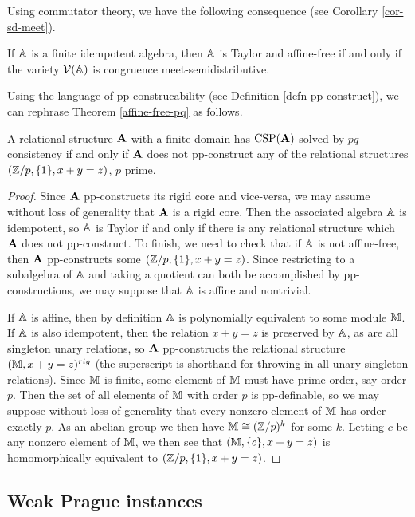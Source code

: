\documentclass[letterpaper,11pt]{article}
\DeclareMathOperator{\CSP}{CSP}
\begin{document}
Using commutator theory, we have the following consequence (see Corollary \ref{cor-sd-meet}).

\begin{cor} If $\mathbb{A}$ is a finite idempotent algebra, then $\mathbb{A}$ is Taylor and affine-free if and only if the variety $\mathcal{V}(\mathbb{A})$ is congruence meet-semidistributive.
\end{cor}

Using the language of pp-construcability (see Definition \ref{defn-pp-construct}), we can rephrase Theorem \ref{affine-free-pq} as follows.

\begin{cor} A relational structure $\mathbf{A}$ with a finite domain has $\CSP(\fA)$ solved by $pq$-consistency if and only if $\mathbf{A}$ does not pp-construct any of the relational structures $(\mathbb{Z}/p,\{1\},x+y=z)$, $p$ prime.
\end{cor}
\begin{proof} Since $\mathbf{A}$ pp-constructs its rigid core and vice-versa, we may assume without loss of generality that $\mathbf{A}$ is a rigid core. Then the associated algebra $\mathbb{A}$ is idempotent, so $\mathbb{A}$ is Taylor if and only if there is any relational structure which $\mathbf{A}$ does not pp-construct. To finish, we need to check that if $\mathbb{A}$ is not affine-free, then $\mathbf{A}$ pp-constructs some $(\mathbb{Z}/p,\{1\},x+y=z)$. Since restricting to a subalgebra of $\mathbb{A}$ and taking a quotient can both be accomplished by pp-constructions, we may suppose that $\mathbb{A}$ is affine and nontrivial.

If $\mathbb{A}$ is affine, then by definition $\mathbb{A}$ is polynomially equivalent to some module $\mathbb{M}$. If $\mathbb{A}$ is also idempotent, then the relation $x+y=z$ is preserved by $\mathbb{A}$, as are all singleton unary relations, so $\mathbf{A}$ pp-constructs the relational structure $(\mathbb{M},x+y=z)^{rig}$ (the superscript is shorthand for throwing in all unary singleton relations). Since $\mathbb{M}$ is finite, some element of $\mathbb{M}$ must have prime order, say order $p$. Then the set of all elements of $\mathbb{M}$ with order $p$ is pp-definable, so we may suppose without loss of generality that every nonzero element of $\mathbb{M}$ has order exactly $p$. As an abelian group we then have $\mathbb{M} \cong (\mathbb{Z}/p)^k$ for some $k$. Letting $c$ be any nonzero element of $\mathbb{M}$, we then see that $(\mathbb{M},\{c\},x+y=z)$ is homomorphically equivalent to $(\mathbb{Z}/p,\{1\},x+y=z)$.
\end{proof}


\subsection{Weak Prague instances}
\end{document}
